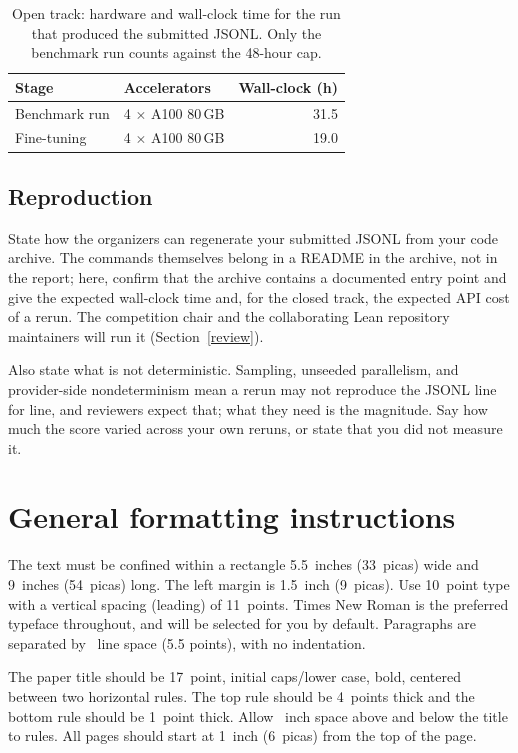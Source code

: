 \documentclass{article}
\begin{document}
\begin{table}[!ht]
  \caption{Open track: hardware and wall-clock time for the run that produced the submitted JSONL. Only the benchmark run counts against the 48-hour cap.}
  \label{hardware-table}
  \centering
  \begin{tabular}{llr}
    \toprule
    Stage & Accelerators & Wall-clock (h) \\
    \midrule
    Benchmark run & 4 $\times$ A100 80\,GB & 31.5 \\
    Fine-tuning   & 4 $\times$ A100 80\,GB & 19.0 \\
    \bottomrule
  \end{tabular}
\end{table}


\subsection{Reproduction}


State how the organizers can regenerate your submitted JSONL from your code archive. The commands themselves belong in a README in the archive, not in the report; here, confirm that the archive contains a documented entry point and give the expected wall-clock time and, for the closed track, the expected API cost of a rerun. The competition chair and the collaborating Lean repository maintainers will run it (Section~\ref{review}).

Also state what is not deterministic. Sampling, unseeded parallelism, and provider-side nondeterminism mean a rerun may not reproduce the JSONL line for line, and reviewers expect that; what they need is the magnitude. Say how much the score varied across your own reruns, or state that you did not measure it.


\section{General formatting instructions}
\label{gen_inst}


The text must be confined within a rectangle 5.5~inches (33~picas) wide and
9~inches (54~picas) long. The left margin is 1.5~inch (9~picas).  Use 10~point
type with a vertical spacing (leading) of 11~points.  Times New Roman is the
preferred typeface throughout, and will be selected for you by default.
Paragraphs are separated by ~line space (5.5 points), with no
indentation.


The paper title should be 17~point, initial caps/lower case, bold, centered
between two horizontal rules. The top rule should be 4~points thick and the
bottom rule should be 1~point thick. Allow ~inch space above and
below the title to rules. All pages should start at 1~inch (6~picas) from the
top of the page.
\end{document}
